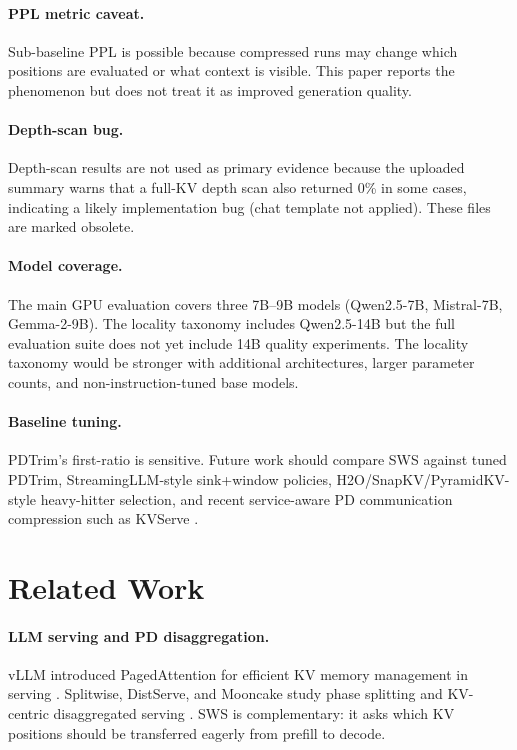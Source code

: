 \documentclass[11pt]{article}
\newcommand{\method}{SWS}
\newcommand{\pct}{\%}
\theoremstyle{definition}
\theoremstyle{plain}
\begin{document}
\paragraph{PPL metric caveat.}
Sub-baseline PPL is possible because compressed runs may change which positions are evaluated or what context is visible.  This paper reports the phenomenon but does not treat it as improved generation quality.

\paragraph{Depth-scan bug.}
Depth-scan results are not used as primary evidence because the uploaded summary warns that a full-KV depth scan also returned 0\pct{} in some cases, indicating a likely implementation bug (chat template not applied).  These files are marked obsolete.

\paragraph{Model coverage.}
The main GPU evaluation covers three 7B--9B models (Qwen2.5-7B, Mistral-7B, Gemma-2-9B).  The locality taxonomy includes Qwen2.5-14B but the full evaluation suite does not yet include 14B quality experiments.  The locality taxonomy would be stronger with additional architectures, larger parameter counts, and non-instruction-tuned base models.

\paragraph{Baseline tuning.}
PDTrim's first-ratio is sensitive.  Future work should compare \method{} against tuned PDTrim, StreamingLLM-style sink+window policies, H2O/SnapKV/PyramidKV-style heavy-hitter selection, and recent service-aware PD communication compression such as KVServe \citep{kvserve}.

\section{Related Work}
\label{sec:related}

\paragraph{LLM serving and PD disaggregation.}
vLLM introduced PagedAttention for efficient KV memory management in serving \citep{vllm}.  Splitwise, DistServe, and Mooncake study phase splitting and KV-centric disaggregated serving \citep{splitwise,distserve,mooncake}.  \method{} is complementary: it asks which KV positions should be transferred eagerly from prefill to decode.
\end{document}
